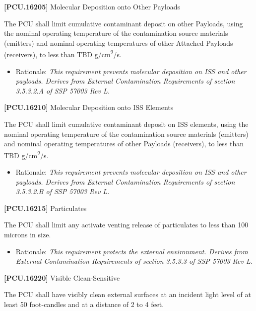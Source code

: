 \documentclass[12pt,oneside,oldfontcommands]{memoir}
\begin{document}
\textbf{[PCU.16205]} Molecular Deposition onto Other Payloads

The \gls{PCU} shall limit cumulative contaminant deposit on other Payloads, using the nominal operating temperature of the contamination source materials (emitters) and nominal operating temperatures of other Attached Payloads (receivers), to less than TBD\label{tbx_17} g\slash cm\textsuperscript{2}\slash s.

\begin{itemize}
\item{} Rationale: \emph{This requirement prevents molecular deposition on ISS and other payloads. Derives from External Contamination Requirements of section 3.5.3.2.A of SSP 57003 Rev L.}

\end{itemize}

\textbf{[PCU.16210]} Molecular Deposition onto \gls{ISS} Elements

The \gls{PCU} shall limit cumulative contaminant deposit on \gls{ISS} elements, using the nominal operating temperature of the contamination source materials (emitters) and nominal operating temperatures of other Payloads (receivers), to less than TBD\label{tbx_18} g\slash cm\textsuperscript{2}\slash s.

\begin{itemize}
\item{} Rationale: \emph{This requirement prevents molecular deposition on ISS and other payloads. Derives from External Contamination Requirements of section 3.5.3.2.B of SSP 57003 Rev L.}

\end{itemize}

\textbf{[PCU.16215]} Particulates

The \gls{PCU} shall limit any activate venting release of particulates to less than 100 microns in size.

\begin{itemize}
\item{} Rationale: \emph{This requirement protects the external environment. Derives from External Contamination Requirements of section 3.5.3.3 of SSP 57003 Rev L.}

\end{itemize}

\textbf{[PCU.16220]} Visible Clean-Sensitive

The \gls{PCU} shall have visibly clean external surfaces at an incident light level of at least 50 foot-candles and at a distance of 2 to 4 feet.
\end{document}
